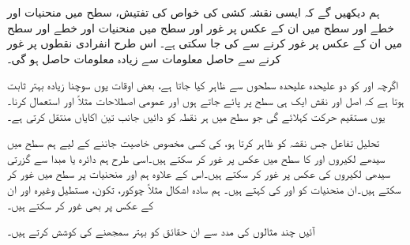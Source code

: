 ہم دیکھیں گے کہ ایسی نقشہ کشی کی خواص کی تفتیش،   سطح میں منحنیات اور خطے اور   سطح میں ان کے عکس پر غور اور  سطح میں منحنیات اور خطے اور   سطح میں ان کے عکس پر غور  کرنے سے  کی جا سکتی ہے۔ اس طرح  انفرادی نقطوں پر غور کرنے سے حاصل معلومات سے  زیادہ معلومات حاصل ہو گی۔

اگرچہ   اور  کو دو علیحدہ علیحدہ سطحوں سے ظاہر کیا جاتا ہے، بعض اوقات یوں  سوچنا زیادہ بہتر ثابت ہوتا ہے  کہ اصل اور نقش ایک ہی سطح پر پائے جاتے ہوں اور  عمومی اصطلاحات مثلاً  اور  استعمال کرنا۔یوں    مستقیم حرکت کہلائے گی جو  سطح میں ہر نقطہ کو دائیں جانب تین اکایاں منتقل کرتی ہے۔

تحلیل تفاعل  جس نقشہ کو ظاہر کرتا ہو، کی کسی مخصوص  خاصیت  جاننے کے لیے ہم  سطح میں سیدھے لکیروں  اور  کا  سطح میں عکس پر غور کر سکتے ہیں۔اسی طرح ہم دائرہ  یا مبدا سے گزرتی سیدھی لکیروں کی عکس پر غور کر سکتے ہیں۔اس کے علاوہ ہم  اور  منحنیات پر  سطح میں غور کر سکتے ہیں۔ان منحنیات کو  اور  کی  کہتے ہیں۔ ہم سادہ اشکال مثلاً چوکور، تکون، مستطیل وغیرہ اور ان کے عکس پر بھی غور کر سکتے ہیں۔

آئیں چند مثالوں کی مدد سے ان حقائق کو بہتر سمجھنے کی کوشش کرتے ہیں۔

